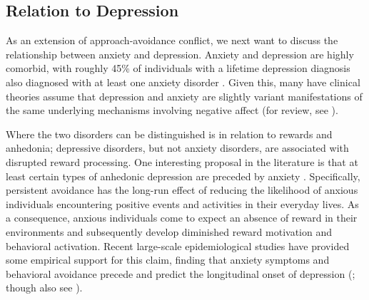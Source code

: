 \documentclass[11pt]{article} %
\begin{document}
\subsection{Relation to Depression}

As an extension of approach-avoidance conflict, we next want to discuss the relationship between anxiety and depression. Anxiety and depression are highly comorbid, with roughly 45\% of individuals with a lifetime depression diagnosis also diagnosed with at least one anxiety disorder \citep{kessler2015}. Given this, many have clinical theories assume that depression and anxiety are slightly variant manifestations of the same underlying mechanisms involving negative affect (for review, see \cite{jacobson2014}).

Where the two disorders can be distinguished is in relation to rewards and anhedonia; depressive disorders, but not anxiety disorders, are associated with disrupted reward processing. One interesting proposal in the literature is that at least certain types of anhedonic depression are preceded by anxiety \citep{alloy1990, moitra2008, jacobson2014}. Specifically, persistent avoidance has the long-run effect of reducing the likelihood of anxious individuals encountering positive events and activities in their everyday lives. As a consequence, anxious individuals come to expect an absence of reward in their environments and subsequently develop diminished reward motivation and behavioral activation. Recent large-scale epidemiological studies have provided  some empirical support for this claim, finding that anxiety symptoms and behavioral avoidance precede and predict the longitudinal onset of depression (\cite{mathew2011, jacobson2014, kessler2015}; though also see \cite{jacobson2017, plana2019}).
\end{document}

